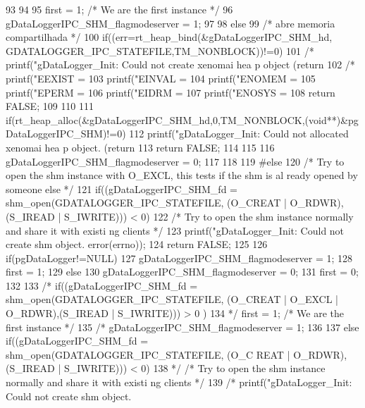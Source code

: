 \begin{DoxyCode}
{{{93                 }
94 
95                 first = 1; /* We are the first instance */
96                 gDataLoggerIPC_SHM_flagmodeserver = 1;
97         }
98         else{
99                 /* abre memoria compartilhada */
100                 if((err=rt_heap_bind(&gDataLoggerIPC_SHM_hd,
      GDATALOGGER_IPC_STATEFILE,TM_NONBLOCK))!=0){
101                         /* printf("gDataLogger_Init: Could not create xenomai hea
      p object (return %
102 /*                      printf("\n EEXIST = %
103                         printf("\n EINVAL = %
104                         printf("\n ENOMEM = %
105                         printf("\n EPERM = %
106                         printf("\n EIDRM = %
107                         printf("\n ENOSYS = %
108                         return FALSE;
109                 }
110 
111                 if(rt_heap_alloc(&gDataLoggerIPC_SHM_hd,0,TM_NONBLOCK,(void**)&pg
      DataLoggerIPC_SHM)!=0){
112                         printf("gDataLogger_Init: Could not allocated xenomai hea
      p object. (return %
113                         return FALSE;
114                 }
115 
116                 gDataLoggerIPC_SHM_flagmodeserver = 0;
117         }
118 
119 #else
120         /* Try to open the shm instance with  O_EXCL, this tests if the shm is al
      ready opened by someone else */
121         if((gDataLoggerIPC_SHM_fd = shm_open(GDATALOGGER_IPC_STATEFILE, (O_CREAT 
      | O_RDWR),(S_IREAD | S_IWRITE))) < 0) {
122                 /* Try to open the shm instance normally and share it with existi
      ng clients */
123                 printf("gDataLogger_Init: Could not create shm object. %
      error(errno));
124                 return FALSE;
125         }       
126         if(pgDataLogger!=NULL){
127                 gDataLoggerIPC_SHM_flagmodeserver = 1;
128                 first = 1;
129         } else{
130                 gDataLoggerIPC_SHM_flagmodeserver = 0;
131                 first = 0;
132         }
133 /*      if((gDataLoggerIPC_SHM_fd = shm_open(GDATALOGGER_IPC_STATEFILE, (O_CREAT 
      | O_EXCL | O_RDWR),(S_IREAD | S_IWRITE))) > 0 ) {
134 */                first = 1; /* We are the first instance */
135 /*                gDataLoggerIPC_SHM_flagmodeserver = 1;
136         }
137         else if((gDataLoggerIPC_SHM_fd = shm_open(GDATALOGGER_IPC_STATEFILE, (O_C
      REAT | O_RDWR),(S_IREAD | S_IWRITE))) < 0) {
138 */              /* Try to open the shm instance normally and share it with existi
      ng clients */
139 /*              printf("gDataLogger_Init: Could not create shm object. %
}}
\end{DoxyCode}
